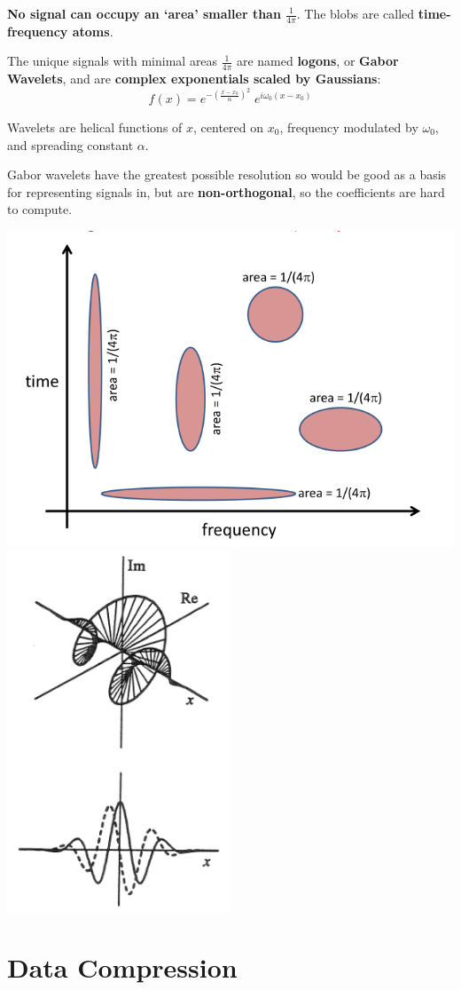 \documentclass[a4paper, 11pt]{article}
\begin{document}
{{\begin{minipage}[t]{0.6\textwidth}
        \textbf{No signal can occupy an `area' smaller than \(\displaystyle \frac{1}{4\pi}\)}. The blobs are called \textbf{time-frequency atoms}.

        The unique signals with minimal areas \(\frac{1}{4\pi}\) are named \textbf{logons}, or \textbf{Gabor Wavelets}, and are \textbf{complex exponentials scaled by Gaussians}:
        \[f(x) = e^{-(\frac{x-x_0}{\alpha})^2}\;e^{i\omega_0(x-x_0)}\]

        Wavelets are helical functions of \(x\), centered on \(x_0\), frequency modulated by \(\omega_0\), and spreading constant \(\alpha\).

        Gabor wavelets have the greatest possible resolution so would be good as a basis for representing signals in, but are \textbf{non-orthogonal}, so the coefficients are hard to compute.
        \end{minipage}
        \hspace{3mm}
        \begin{minipage}[t]{0.35\textwidth}
        \vspace{0pt}
        \centering
        \includegraphics[width=\textwidth]{gabor-quantal.png}\\
        \includegraphics[width=0.5\textwidth]{gabor-wavelets.png}
        \end{minipage}
    }
}
\section*{Data Compression}
{

}
\end{document}
